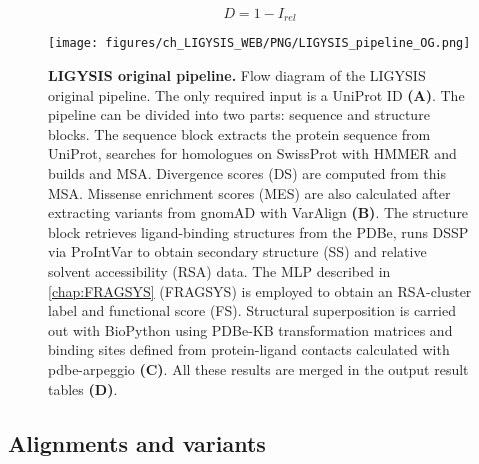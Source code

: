 \vspace{-12pt} %
\vspace{-12pt} %

\begin{equation}
D = 1 - I_{rel}
\label{eq:Irel_distance}
\end{equation}

\vspace{-12pt} %
\vspace{-12pt} %


\begin{figure}[htbp!]
    \centering
    \texttt{[image: figures/ch\_LIGYSIS\_WEB/PNG/LIGYSIS\_pipeline\_OG.png]}
    \caption[LIGYSIS original pipeline]{\textbf{LIGYSIS original pipeline.} Flow diagram of the LIGYSIS original pipeline. The only required input is a UniProt ID \textbf{(A)}. The pipeline can be divided into two parts: sequence and structure blocks. The sequence block extracts the protein sequence from UniProt, searches for homologues on SwissProt with HMMER and builds and MSA. Divergence scores (DS) are computed from this MSA. Missense enrichment scores (MES) are also calculated after extracting variants from gnomAD with VarAlign \textbf{(B)}. The structure block retrieves ligand-binding structures from the PDBe, runs DSSP via ProIntVar to obtain secondary structure (SS) and relative solvent accessibility (RSA) data. The MLP described in \autoref{chap:FRAGSYS} (FRAGSYS) is employed to obtain an RSA-cluster label and functional score (FS). Structural superposition is carried out with BioPython using PDBe-KB transformation matrices and binding sites defined from protein-ligand contacts calculated with pdbe-arpeggio \textbf{(C)}. All these results are merged in the output result tables \textbf{(D)}.}
    \label{fig:ligysis_pipeline_OG}
\end{figure}

\subsection{Alignments and variants}


